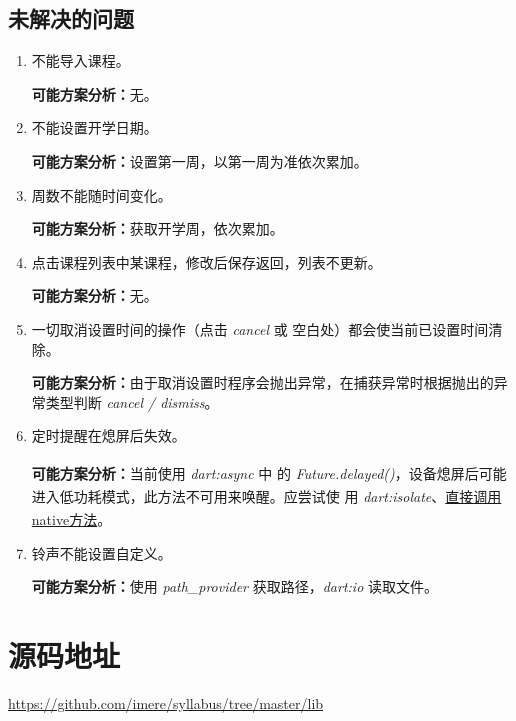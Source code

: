 \documentclass[12pt]{article}
\begin{document}
  \subsection{未解决的问题}

    \begin{enumerate}
      \item 不能导入课程。

        \textbf{可能方案分析：}无。

      \item 不能设置开学日期。

        \textbf{可能方案分析：}设置第一周，以第一周为准依次累加。

      \item 周数不能随时间变化。

        \textbf{可能方案分析：}获取开学周，依次累加。

      \item 点击课程列表中某课程，修改后保存返回，列表不更新。

        \textbf{可能方案分析：}无。

      \item 一切取消设置时间的操作（点击 \textit{cancel} 或 空白处）都会使当前已设置时间清除。

        \textbf{可能方案分析：}由于取消设置时程序会抛出异常，在捕获异常时根据抛出的异常类型判断
        \textit{cancel / dismiss}。

      \item 定时提醒在熄屏后失效。

        \textbf{可能方案分析：}当前使用 \textit{dart:async}\textsuperscript{\cite{ref:async}} 中
        的 \textit{Future.delayed()}，设备熄屏后可能进入低功耗模式，此方法不可用来唤醒。应尝试使
        用 \textit{dart:isolate}\textsuperscript{\cite{ref:isolate}}、\uline{直接调用native方法}\textsuperscript{\cite{ref:PlatformChannels}}。

      \item 铃声不能设置自定义。

        \textbf{可能方案分析：}使用 \textit{path\_provider} 获取路径，\textit{dart:io} 读取文件。
    \end{enumerate}

\section*{源码地址}

  \url{https://github.com/imere/syllabus/tree/master/lib}
\end{document}
